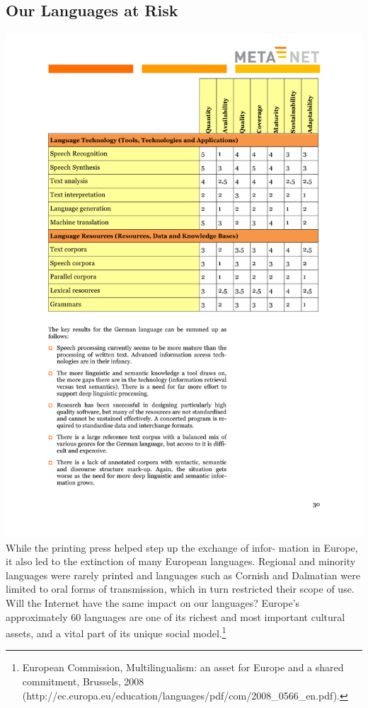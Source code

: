 \documentclass[]{../metanetpaper}
\begin{document}
\subsection{Our Languages at Risk}
\includegraphics[scale=0.75]{../media/metanet-paper2.pdf} 
While the printing press helped step up the exchange of infor-
mation in Europe, it also led to the extinction of many European
languages. Regional and minority languages were rarely printed
and languages such as Cornish and Dalmatian were limited to oral
forms of transmission, which in turn restricted their scope of use.
Will the Internet have the same impact on our languages?
Europe’s approximately 60 languages are one of its richest and
most important cultural assets, and a vital part of its unique social
model.\footnote{European Commission, Multilingualism: an asset for Europe and a shared commitment, Brussels,
2008 (http://ec.europa.eu/education/languages/pdf/com/2008\_0566\_en.pdf).}
\end{document}

